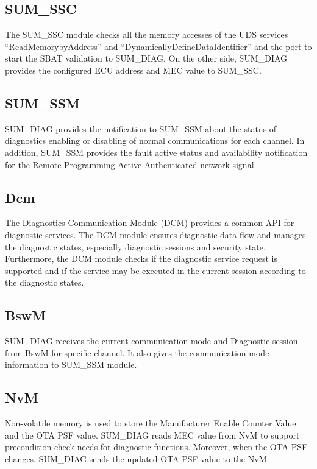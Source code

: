 \subsection{SUM_SSC}

The SUM_SSC module checks all the memory accesses of the UDS services “ReadMemorybyAddress” and “DynamicallyDefineDataIdentifier” and the port to start the SBAT validation to SUM_DIAG. On the other side, SUM_DIAG provides the configured ECU address and MEC value to SUM_SSC.

\subsection{SUM_SSM}

SUM_DIAG provides the notification to SUM_SSM about the status of diagnostics enabling or disabling of normal communications for each channel. In addition, SUM_SSM provides the fault active status and availability notification for the Remote Programming Active Authenticated network signal.

\subsection{Dcm}

The Diagnostics Communication Module (DCM) provides a common API for diagnostic services. The DCM module ensures diagnostic data flow and manages the diagnostic states, especially diagnostic sessions and security state. Furthermore, the DCM module checks if the diagnostic service request is supported and if the service may be executed in the current session according to the diagnostic states.

\subsection{BswM}

SUM_DIAG receives the current communication mode and Diagnostic session from BswM for specific channel. It also gives the communication mode information to SUM_SSM module.

\subsection{NvM}

Non-volatile memory is used to store the Manufacturer Enable Counter Value and the OTA PSF value. SUM_DIAG reads MEC value from NvM to support precondition check needs for diagnostic functions. Moreover, when the OTA PSF changes, SUM_DIAG sends the updated OTA PSF value to the NvM.

